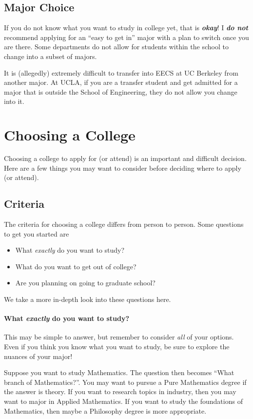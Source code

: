 \documentclass[12pt]{article}
\newenvironment{example}{
\begin{tcolorbox}[title=Example, colback=blue!5!white, colframe=black!75!blue]
}{ \end{tcolorbox} }
\renewcommand{\it}[1]{\textit{{#1}}}
\newcommand{\ib}[1]{\textit{\textbf{{#1}}}}
\begin{document}
\subsection{Major Choice}
If you do not know what you want to study in college yet, that is \ib{okay}! I
\ib{do not} recommend applying for an ``easy to get in'' major with a plan to
switch once you are there. Some departments do not allow for students within the
school to change into a subset of majors.
\begin{example}
  It is (allegedly) extremely difficult to transfer into EECS at UC Berkeley
  from another major. At UCLA, if you are a transfer student and get admitted
  for a major that is outside the School of Engineering, they do not allow you
  change into it.
\end{example}


\section{Choosing a College}
Choosing a college to apply for (or attend) is an important and difficult
decision. Here are a few things you may want to consider before deciding where
to apply (or attend).

\subsection{Criteria}
The criteria for choosing a college differs from person to person. Some
questions to get you started are
\begin{itemize}[label=$\to$]
  \item What \it{exactly} do you want to study?
  \item What do you want to get out of college?
  \item Are you planning on going to graduate school?
\end{itemize}

We take a more in-depth look into these questions here.

\paragraph{What \ib{exactly} do you want to study?} This may be simple to
answer, but remember to consider \it{all} of your options. Even if you think you
know what you want to study, be sure to explore the nuances of your major!
\begin{example}
  Suppose you want to study Mathematics. The question then becomes ``What branch
  of Mathematics?''. You may want to pursue a Pure Mathematics degree if the
  answer is theory. If you want to research topics in industry, then you may
  want to major in Applied Mathematics. If you want to study the foundations of
  Mathematics, then maybe a Philosophy degree is more appropriate.
\end{example}
\end{document}
